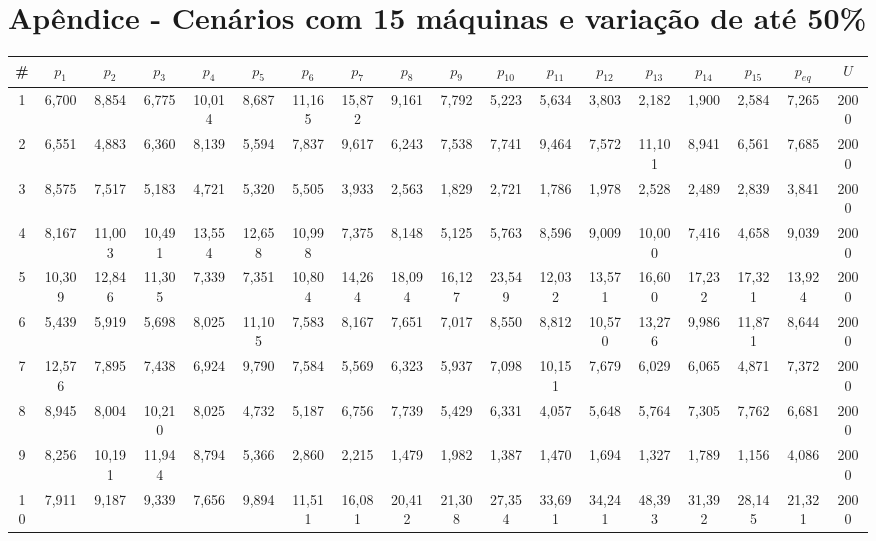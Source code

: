 \newpage
\section{Apêndice - Cenários com 15 máquinas e variação de até 50\%}\label{app:tab15machine50}
{\tiny\tabcolsep=2pt %
\begin{longtable}{ >{\tiny}cccccccccccccccccc}
\hline
\#  & $p_1$     & $p_2$     & $p_3$     & $p_4$     & $p_5$     & $p_6$     & $p_7$     & $p_8$     & $p_9$     & $p_{10}$    & $p_{11}$    & $p_{12}$    & $p_{13}$    & $p_{14}$    & $p_{15}$    & $p_{eq}$    & $U$    \\ \hline
1   & 6,700  & 8,854  & 6,775  & 10,014 & 8,687  & 11,165 & 15,872 & 9,161  & 7,792  & 5,223  & 5,634  & 3,803  & 2,182   & 1,900   & 2,584   & 7,265  & 2000 \\
2   & 6,551  & 4,883  & 6,360  & 8,139  & 5,594  & 7,837  & 9,617  & 6,243  & 7,538  & 7,741  & 9,464  & 7,572  & 11,101  & 8,941   & 6,561   & 7,685  & 2000 \\
3   & 8,575  & 7,517  & 5,183  & 4,721  & 5,320  & 5,505  & 3,933  & 2,563  & 1,829  & 2,721  & 1,786  & 1,978  & 2,528   & 2,489   & 2,839   & 3,841  & 2000 \\
4   & 8,167  & 11,003 & 10,491 & 13,554 & 12,658 & 10,998 & 7,375  & 8,148  & 5,125  & 5,763  & 8,596  & 9,009  & 10,000  & 7,416   & 4,658   & 9,039  & 2000 \\
5   & 10,309 & 12,846 & 11,305 & 7,339  & 7,351  & 10,804 & 14,264 & 18,094 & 16,127 & 23,549 & 12,032 & 13,571 & 16,600  & 17,232  & 17,321  & 13,924 & 2000 \\
6   & 5,439  & 5,919  & 5,698  & 8,025  & 11,105 & 7,583  & 8,167  & 7,651  & 7,017  & 8,550  & 8,812  & 10,570 & 13,276  & 9,986   & 11,871  & 8,644  & 2000 \\
7   & 12,576 & 7,895  & 7,438  & 6,924  & 9,790  & 7,584  & 5,569  & 6,323  & 5,937  & 7,098  & 10,151 & 7,679  & 6,029   & 6,065   & 4,871   & 7,372  & 2000 \\
8   & 8,945  & 8,004  & 10,210 & 8,025  & 4,732  & 5,187  & 6,756  & 7,739  & 5,429  & 6,331  & 4,057  & 5,648  & 5,764   & 7,305   & 7,762   & 6,681  & 2000 \\
9   & 8,256  & 10,191 & 11,944 & 8,794  & 5,366  & 2,860  & 2,215  & 1,479  & 1,982  & 1,387  & 1,470  & 1,694  & 1,327   & 1,789   & 1,156   & 4,086  & 2000 \\
10  & 7,911  & 9,187  & 9,339  & 7,656  & 9,894  & 11,511 & 16,081 & 20,412 & 21,308 & 27,354 & 33,691 & 34,241 & 48,393  & 31,392  & 28,145  & 21,321 & 2000 \\

\end{longtable}}
